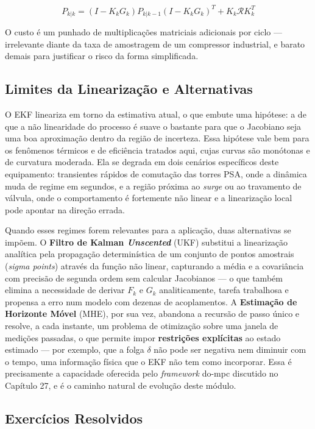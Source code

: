 \documentclass[12pt,a4paper]{article}
\numberwithin{equation}{section}
\numberwithin{table}{section}
\numberwithin{figure}{section}
\begin{document}
{	\begin{equation}\label{eq:s21-8}
	P_{k|k} = (I - K_k G_k) P_{k|k-1} (I - K_k G_k)^T + K_k \mathcal{R} K_k^T
\end{equation}

	O custo é um punhado de multiplicações matriciais adicionais por ciclo — irrelevante diante da taxa de amostragem de um compressor industrial, e barato demais para justificar o risco da forma simplificada.

	\subsection{Limites da Linearização e Alternativas}

	O EKF lineariza em torno da estimativa atual, o que embute uma hipótese: a de que a não linearidade do processo é suave o bastante para que o Jacobiano seja uma boa aproximação dentro da região de incerteza. Essa hipótese vale bem para os fenômenos térmicos e de eficiência tratados aqui, cujas curvas são monótonas e de curvatura moderada. Ela se degrada em dois cenários específicos deste equipamento: transientes rápidos de comutação das torres PSA, onde a dinâmica muda de regime em segundos, e a região próxima ao \textit{surge} ou ao travamento de válvula, onde o comportamento é fortemente não linear e a linearização local pode apontar na direção errada.

	Quando esses regimes forem relevantes para a aplicação, duas alternativas se impõem. O \textbf{Filtro de Kalman \textit{Unscented}} (UKF) substitui a linearização analítica pela propagação determinística de um conjunto de pontos amostrais (\textit{sigma points}) através da função não linear, capturando a média e a covariância com precisão de segunda ordem sem calcular Jacobianos — o que também elimina a necessidade de derivar $F_k$ e $G_k$ analiticamente, tarefa trabalhosa e propensa a erro num modelo com dezenas de acoplamentos. A \textbf{Estimação de Horizonte Móvel} (MHE), por sua vez, abandona a recursão de passo único e resolve, a cada instante, um problema de otimização sobre uma janela de medições passadas, o que permite impor \textbf{restrições explícitas} ao estado estimado — por exemplo, que a folga $\delta$ não pode ser negativa nem diminuir com o tempo, uma informação física que o EKF não tem como incorporar. Essa é precisamente a capacidade oferecida pelo \textit{framework} do-mpc discutido no Capítulo 27, e é o caminho natural de evolução deste módulo.

	\subsection{Exercícios Resolvidos}

}
\end{document}

